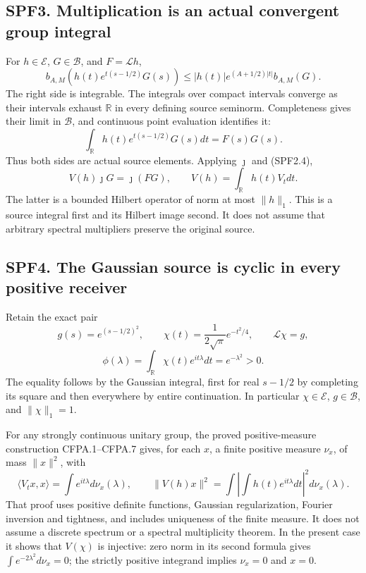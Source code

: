 \subsection{SPF3. Multiplication is an actual convergent group
integral}\label{spf3.-multiplication-is-an-actual-convergent-group-integral}

For \(h\in\mathcal E\), \(G\in\mathcal B\), and \(F=\mathcal Lh\), \[
b_{A,M}(h(t)e^{t(s-1/2)}G(s))
\le |h(t)|e^{(A+1/2)|t|}b_{A,M}(G).
\tag{SPF3.1}
\] The right side is integrable. The integrals over compact intervals
converge as their intervals exhaust \(\mathbb R\) in every defining
source seminorm. Completeness gives their limit in \(\mathcal B\), and
continuous point evaluation identifies it: \[
\int_{\mathbb R}h(t)e^{t(s-1/2)}G(s)dt=F(s)G(s).
\tag{SPF3.2}
\] Thus both sides are actual source elements. Applying \(\jmath\) and
(SPF2.4), \[
\boxed{V(h)\jmath G=\jmath(FG),\qquad
V(h)=\int_{\mathbb R}h(t)V_tdt.}
\tag{SPF3.3}
\] The latter is a bounded Hilbert operator of norm at most \(\|h\|_1\).
This is a source integral first and its Hilbert image second. It does
not assume that arbitrary spectral multipliers preserve the original
source.

\subsection{SPF4. The Gaussian source is cyclic in every positive
receiver}\label{spf4.-the-gaussian-source-is-cyclic-in-every-positive-receiver}

Retain the exact pair \[
g(s)=e^{(s-1/2)^2},\qquad
\chi(t)=\frac1{2\sqrt\pi}e^{-t^2/4},\qquad
\mathcal L\chi=g,
\] \[
\phi(\lambda)=\int_{\mathbb R}\chi(t)e^{it\lambda}dt
=e^{-\lambda^2}>0.
\tag{SPF4.1}
\] The equality follows by the Gaussian integral, first for real
\(s-1/2\) by completing its square and then everywhere by entire
continuation. In particular \(\chi\in\mathcal E\), \(g\in\mathcal B\),
and \(\|\chi\|_1=1\).

For any strongly continuous unitary group, the proved positive-measure
construction CFPA.1--CFPA.7 gives, for each \(x\), a finite positive
measure \(\nu_x\), of mass \(\|x\|^2\), with \[
\langle V_tx,x\rangle=\int e^{it\lambda}d\nu_x(\lambda),
\qquad
\|V(h)x\|^2=\int\left|\int h(t)e^{it\lambda}dt\right|^2d\nu_x(\lambda).
\tag{SPF4.2}
\] That proof uses positive definite functions, Gaussian regularization,
Fourier inversion and tightness, and includes uniqueness of the finite
measure. It does not assume a discrete spectrum or a spectral
multiplicity theorem. In the present case it shows that \(V(\chi)\) is
injective: zero norm in its second formula gives
\(\int e^{-2\lambda^2}d\nu_x=0\); the strictly positive integrand
implies \(\nu_x=0\) and \(x=0\).


